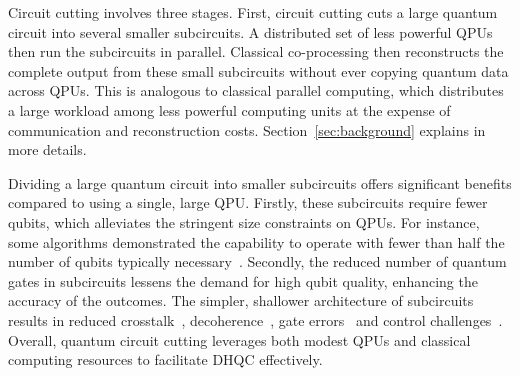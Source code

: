 Circuit cutting involves three stages.
First, circuit cutting cuts a large quantum circuit into several smaller subcircuits.
A distributed set of less powerful QPUs then run the subcircuits in parallel.
Classical co-processing then reconstructs the complete output from these small subcircuits without ever copying quantum data across QPUs.
This is analogous to classical parallel computing,
which distributes a large workload among less powerful computing units at the expense of communication and reconstruction costs.
Section~\ref{sec:background} explains in more details.

Dividing a large quantum circuit into smaller subcircuits offers significant benefits compared to using a single, large QPU.
Firstly, these subcircuits require fewer qubits, which alleviates the stringent size constraints on QPUs.
For instance, some algorithms demonstrated the capability to operate with fewer than half the number of qubits typically necessary~\cite{tang2021cutqc}.
Secondly, the reduced number of quantum gates in subcircuits lessens the demand for high qubit quality,
enhancing the accuracy of the outcomes.
The simpler, shallower architecture of subcircuits results in reduced crosstalk~\cite{mundada2019suppression},
decoherence~\cite{klimov2018fluctuations},
gate errors~\cite{arute2019quantum} and control challenges~\cite{abdelhafez2020universal}.
Overall, quantum circuit cutting leverages both modest QPUs and classical computing resources to facilitate DHQC effectively.


